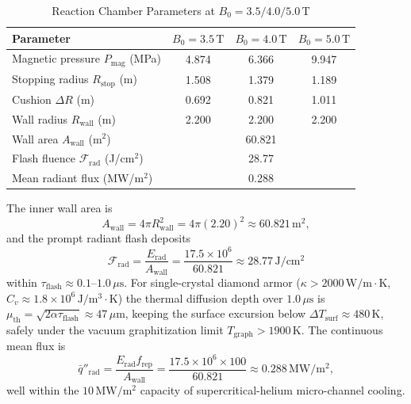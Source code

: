 \documentclass[10pt,journal,compsoc]{IEEEtran}
\newcommand{\T}{\,\mathrm{T}}
\newcommand{\mus}{\,\mu\mathrm{s}}
\begin{document}
\begin{table}[h]
\centering
\caption{Reaction Chamber Parameters at $B_0 = 3.5/4.0/5.0\T$}
\label{tab:chamber}
\scriptsize
\setlength{\tabcolsep}{3pt}
\begin{tabular}{lccc}
\toprule
\textbf{Parameter} & $B_0=3.5\T$ & $B_0=4.0\T$ & $B_0=5.0\T$ \\
\midrule
Magnetic pressure $P_{\mathrm{mag}}$ (MPa) & 4.874 & 6.366 & 9.947 \\
Stopping radius $R_{\mathrm{stop}}$ (m)    & 1.508 & 1.379 & 1.189 \\
Cushion $\Delta R$ (m)                     & 0.692 & 0.821 & 1.011 \\
Wall radius $R_{\mathrm{wall}}$ (m)        & 2.200 & 2.200 & 2.200 \\
Wall area $A_{\mathrm{wall}}$ (m$^2$)      & \multicolumn{3}{c}{60.821} \\
Flash fluence $\mathcal{F}_{\mathrm{rad}}$ (J/cm$^2$) & \multicolumn{3}{c}{28.77} \\
Mean radiant flux (MW/m$^2$)               & \multicolumn{3}{c}{0.288} \\
\bottomrule
\end{tabular}
\end{table}

The inner wall area is
\begin{equation}
A_{\mathrm{wall}} = 4\pi R_{\mathrm{wall}}^2 = 4\pi(2.20)^2
 \approx 60.821\,\mathrm{m^2},
\end{equation}
and the prompt radiant flash deposits
\begin{equation}
\mathcal{F}_{\mathrm{rad}} = \frac{E_{\mathrm{rad}}}{A_{\mathrm{wall}}}
 = \frac{17.5\times10^{6}}{60.821}
 \approx 28.77\,\mathrm{J/cm^2}
\end{equation}
within $\tau_{\mathrm{flash}} \approx 0.1\text{--}1.0\mus$. For
single-crystal diamond armor ($\kappa > 2000\,\mathrm{W/m\cdot K}$,
$C_v \approx 1.8\times10^{6}\,\mathrm{J/m^3\cdot K}$) the thermal
diffusion depth over $1.0\mus$ is
$\mu_{\mathrm{th}} = \sqrt{2\alpha\tau_{\mathrm{flash}}}\approx47\,\mu\mathrm{m}$,
keeping the surface excursion below $\Delta T_{\mathrm{surf}} \approx 480\,
\mathrm{K}$, safely under the vacuum graphitization limit
$T_{\mathrm{graph}} > 1900\,\mathrm{K}$. The continuous mean flux is
\begin{equation}
\bar{q}''_{\mathrm{rad}} = \frac{E_{\mathrm{rad}}f_{\mathrm{rep}}}
  {A_{\mathrm{wall}}}
 = \frac{17.5\times10^{6}\times100}{60.821}
 \approx 0.288\,\mathrm{MW/m^2},
\end{equation}
well within the $10\,\mathrm{MW/m^2}$ capacity of supercritical-helium
micro-channel cooling.
\end{document}
